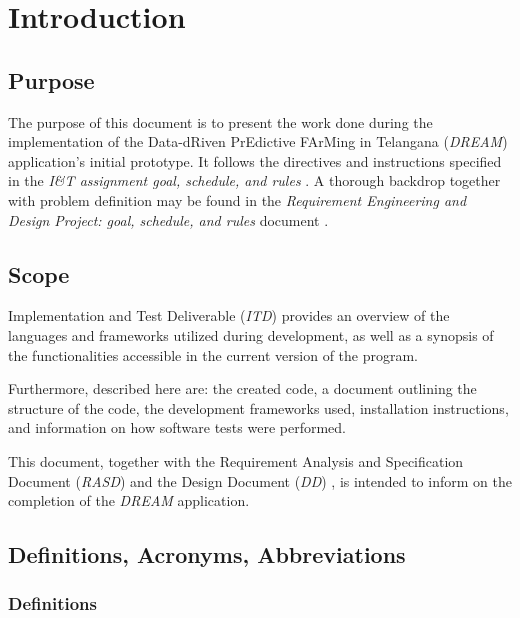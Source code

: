 \chapter{Introduction}

\section{Purpose}

The purpose of this document is to present the work done during the implementation of the Data-dRiven PrEdictive FArMing in Telangana (\textit{DREAM}) application's initial prototype. It follows the directives and instructions specified in the \textit{I\&T assignment goal, schedule, and rules} \cite{reference_doc2}. A thorough backdrop together with problem definition may be found in the \textit{Requirement Engineering and Design Project: goal, schedule, and rules} document \cite{reference_doc}.

\section{Scope}

Implementation and Test Deliverable (\textit{ITD}) provides an overview of the languages and frameworks utilized during development, as well as a synopsis of the functionalities accessible in the current version of the program.

Furthermore, described here are: the created code, a document outlining the structure of the code, the development frameworks used, installation instructions, and information on how software tests were performed.

This document, together with the Requirement Analysis and Specification Document (\textit{RASD}) \cite{rasd} and the Design Document (\textit{DD}) \cite{dd}, is intended to inform on the completion of the \textit{DREAM} application.

\section{Definitions, Acronyms, Abbreviations}

\subsection{Definitions}

